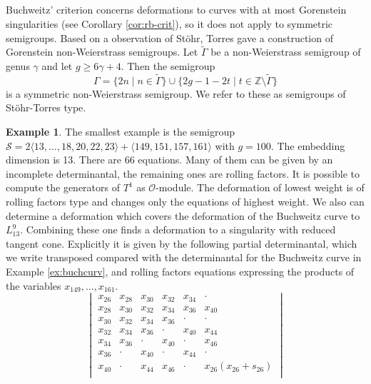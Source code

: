 \documentclass{amsart}
\newcommand{\Z}{\mathbb{Z}}
\renewcommand{\S}{\mathcal S}
\newcommand{\mO}{\mathcal{O}}
\def\x(#1){x_{#1}}
\def\t(#1){s_{#1}}
\theoremstyle{definition}
\newtheorem{ex}[thm]{Example}
\theoremstyle{remark}
\begin{document}
\subsection{}
Buchweitz' criterion concerns deformations to curves with at most Gorenstein singularities
(see Corollary \ref{cor:rb-crit}), so it does not apply to symmetric semigroups. 
 Based on a observation of Stöhr, Torres gave a construction  \cite[Scholium 3.5]{To}
of Gorenstein non-Weierstrass semigroups.
Let $\widetilde\Gamma$ be a non-Weierstrass semigroup of genus $\gamma$ and
 let $g\geq 6\gamma +4$. Then the semigroup
 \[
 \Gamma=\{2n \mid n\in \widetilde\Gamma\}\cup \{2g-1-2t\mid t\in \Z\setminus \widetilde\Gamma\}
 \]
 is a symmetric non-Weierstrass semigroup. We refer to these as semigroups of Stöhr-Torres type.

\begin{ex}
The smallest example is 
the semigroup \(
\S=2\langle13,\dots,18,20,22,23\rangle + \langle149,151,157,161\rangle
\)
with $g=100$.
The embedding dimension is 13. There are 66 equations.
%
Many of them can be given by an incomplete determinantal, the remaining ones are
rolling factors. It is possible to compute the generators of $T^1$ as $\mO$-module.
The deformation of lowest weight is of rolling factors type and changes only the equations of
highest weight. We also can determine a deformation which covers the deformation
of the Buchweitz curve to $L_{13}^9$. Combining these one finds a deformation to a singularity 
with reduced tangent cone. Explicitly it is given by the following partial determinantal,
which we write transposed compared with the determinantal for the Buchweitz curve
in Example \ref{ex:buchcurv}, and rolling factors equations expressing the products of the variables
$\x(149), \dots, \x(161)$.
\[
\begin{vmatrix}
\x(26) &    \x(28) &     \x(30) &    \x(32) &     \x(34)  & \cdot \\
\x(28) &     \x(30) &    \x(32) &    \x(34) &     \x(36) & \x(40)\\
 \x(30) &    \x(32) &    \x(34) &    \x(36)  &    \cdot   &\cdot \\
 \x(32) &   \x(34) &    \x(36)  &   \cdot &     \x(40) & \x(44)\\
 \x(34) &    \x(36)  &   \cdot  &     \x(40)  &    \cdot & \x(46)\\
 \x(36)  &   \cdot &     \x(40)   &   \cdot &   \x(44)   & \cdot\\
 \x(40)   &   \cdot  &   \x(44)&     \x(46)   &   \cdot & \x(26)( \x(26)+\t(26))\\

\end{vmatrix}\]
\end{ex}
\end{document}
